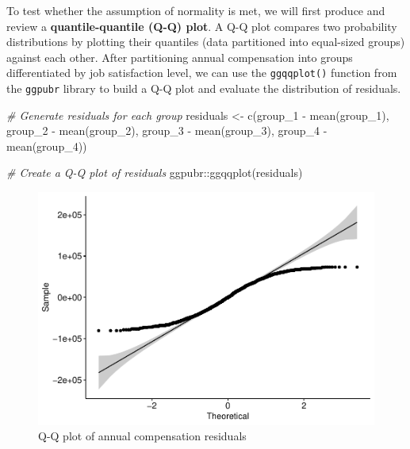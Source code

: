 \documentclass[
]{book}
\newenvironment{Shaded}{\begin{snugshade}}{\end{snugshade}}
\newcommand{\CommentTok}[1]{\textcolor[rgb]{0.56,0.35,0.01}{\textit{#1}}}
\newcommand{\FunctionTok}[1]{\textcolor[rgb]{0.00,0.00,0.00}{#1}}
\newcommand{\NormalTok}[1]{#1}
\newcommand{\OtherTok}[1]{\textcolor[rgb]{0.56,0.35,0.01}{#1}}
\newcommand{\SpecialCharTok}[1]{\textcolor[rgb]{0.00,0.00,0.00}{#1}}
\begin{document}
To test whether the assumption of normality is met, we will first produce and review a \textbf{quantile-quantile (Q-Q) plot}. A Q-Q plot compares two probability distributions by plotting their quantiles (data partitioned into equal-sized groups) against each other. After partitioning annual compensation into groups differentiated by job satisfaction level, we can use the \texttt{ggqqplot()} function from the \texttt{ggpubr} library to build a Q-Q plot and evaluate the distribution of residuals.

\begin{Shaded}
\begin{Highlighting}[]
\CommentTok{\# Generate residuals for each group}
\NormalTok{residuals }\OtherTok{\textless{}{-}} \FunctionTok{c}\NormalTok{(group\_1 }\SpecialCharTok{{-}} \FunctionTok{mean}\NormalTok{(group\_1), group\_2 }\SpecialCharTok{{-}} \FunctionTok{mean}\NormalTok{(group\_2), group\_3 }\SpecialCharTok{{-}} \FunctionTok{mean}\NormalTok{(group\_3), group\_4 }\SpecialCharTok{{-}} \FunctionTok{mean}\NormalTok{(group\_4))}

\CommentTok{\# Create a Q{-}Q plot of residuals}
\NormalTok{ggpubr}\SpecialCharTok{::}\FunctionTok{ggqqplot}\NormalTok{(residuals)}
\end{Highlighting}
\end{Shaded}

\begin{figure}

{\centering \includegraphics{The_Fundamentals_of_People_Analytics_files/figure-latex/qq-plot-1} 

}

\caption{Q-Q plot of annual compensation residuals}\label{fig:qq-plot}
\end{figure}
\end{document}
